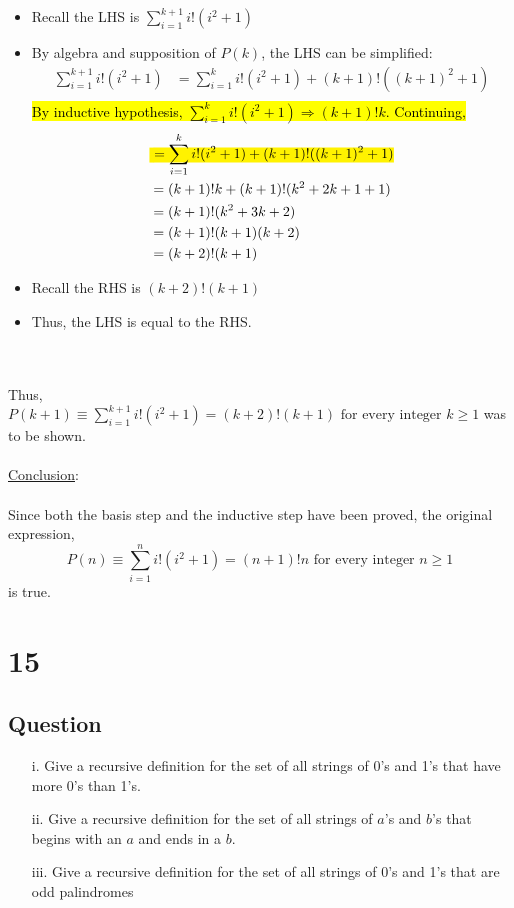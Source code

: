 \documentclass[12pt]{article}
\newcommand{\xlist}[1]{
    \begin{itemize}
        \renewcommand{\labelitemi}{$\centerdot$}
        #1
    \end{itemize}
    \newblock
    \\ \\
}
\newcommand{\xconclusion}{
    \underline{Conclusion}:
    \\ \\
}
\begin{document}
\xlist{
    \item Recall the LHS is $\sum_{i=1}^{k+1}i!(i^2 + 1)$
    \item By algebra and supposition of $P(k)$, the LHS can be simplified:
    \begin{align*}
        \sum_{i=1}^{k+1}i!(i^2 + 1) &= \sum_{i=1}^{k}i!(i^2 + 1) + (k+1)!((k+1)^2 + 1) \\
    \end{align*}
    \hl{By inductive hypothesis, $\sum_{i=1}^{k}i!(i^2 + 1) \Rightarrow (k+1)!k$. Continuing,}
    \begin{align*}
        &\text{\hl{ $= \sum_{i=1}^{k}i!(i^2 + 1) + (k+1)!((k+1)^2 + 1)$}} \\
        &= (k+1)!k + (k+1)!(k^2 +2k + 1 + 1) \\
        &= (k+1)!(k^2 +3k + 2) \\ 
        &= (k+1)!(k+1)(k+2) \\ 
        &= (k+2)!(k+1) \\ 
    \end{align*}
    \item Recall the RHS is $(k+2)!(k+1)$
    \item Thus, the LHS is equal to the RHS.
}
Thus, $P(k+1) \equiv \sum_{i=1}^{k+1}i!(i^2 + 1) = (k+2)!(k+1)\text{ for every integer }k \geq 1$ was to be shown.
\\ \\
\xconclusion
Since both the basis step and the inductive step have been proved, the original expression,
$$P(n) \equiv \sum_{i=1}^{n}i!(i^2 + 1) = (n+1)!n\text{ for every integer }n \geq 1$$
is true.
\section*{15}
\subsection*{Question}
\begin{itemize}
    \item [i.] Give a recursive definition for the set of all strings of 0’s and 1’s that have more 0’s than 1’s.
    \item [ii.] Give a recursive definition for the set of all strings of $a$’s and $b$’s that begins with an $a$ and ends in a $b$.
    \item [iii.] Give a recursive definition for the set of all strings of 0’s and 1’s that are odd palindromes
\end{itemize}
\end{document}
